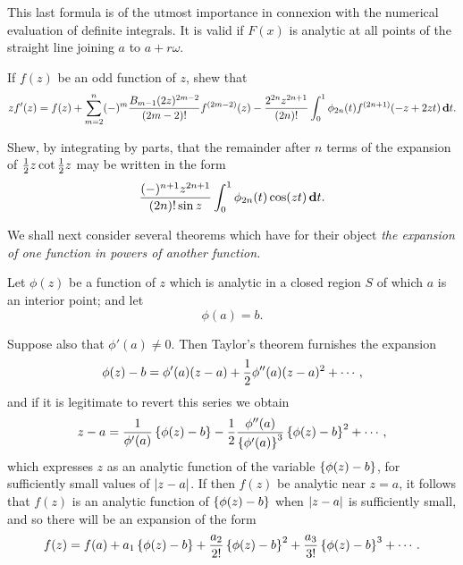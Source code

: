 This last formula is of the utmost importance in connexion with the
numerical evaluation of definite integrals. It is valid if $F(x)$ is
analytic at all points of the straight line joining
$a$ to $a + r \omega$.

\begin{wandwexample}
  If $f(z)$ be an odd function of $z$, shew that
  $$
  z f'(z)
  =
  f(z)
  +
  \sum_{m=2}^{n}
  (-)^{m}
  \frac{B_{m-1} (2z)^{2m-2}}{(2m-2)!}
  f^{(2m-2)}(z)
  -
  \frac{2^{2n} z^{2n+1}}{(2n)!}
  \int_{0}^{1}
  \phi_{2n}(t)
  f^{(2n+1)}(-z + 2zt)
  \, \mathbf{d} t.
  $$
\end{wandwexample}
\begin{wandwexample}
  Shew, by integrating by parts, that the remainder after $n$
  terms of the expansion of $\frac{1}{2} z \cot \frac{1}{2} z$ may be written in the form
  $$
  \frac{ (-)^{n+1} z^{2n+1} }{ (2n)! \sin z }
  \int_{0}^{1} \phi_{2n}(t) \cos (zt) \, \mathbf{d} t.
  $$
\end{wandwexample}

We shall next consider several theorems which have for their object
\emph{the expansion of one function in powers of another function.}

%
%

Let $\phi(z)$ be a function of $z$ which is analytic in a closed
region $S$ of which $a$ is an interior point; and let
$$
\phi(a) = b.
$$

Suppose also that $\phi'(a) \neq 0$. Then Taylor's theorem furnishes the
expansion
$$
\phi(z) - b
=
\phi'(a) (z-a)
+ \frac{1}{2} \phi''(a) (z-a)^{2}
+ \cdots,
$$
and if it is legitimate to revert this series we obtain
$$
z - a
=
\frac{1}{\phi'(a)}
\left\{  \phi(z) - b  \right\}
-
\frac{1}{2} \frac{\phi''(a)}{\left\{ \phi'(a) \right\}^{3}}
\left\{  \phi(z) - b  \right\}^{2}
+ \cdots,
$$
which expresses $z$ as an analytic function of the variable
$\left\{  \phi(z) - b  \right\}$,
for sufficiently small values of $\left| z-a \right|$. If then $f(z)$ be
analytic near $z = a$, it follows that $f(z)$ is an analytic function
of $\left\{  \phi(z) - b  \right\}$
when $\left| z - a \right|$ is sufficiently small, and so there will be an
expansion of the form
$$
f(z)
=
f(a)
+ a_{1} \left\{  \phi(z) - b  \right\}
+ \frac{a_{2}}{2!} \left\{  \phi(z) - b  \right\}^{2}
+ \frac{a_{3}}{3!} \left\{  \phi(z) - b  \right\}^{3}
+ \cdots.
$$

